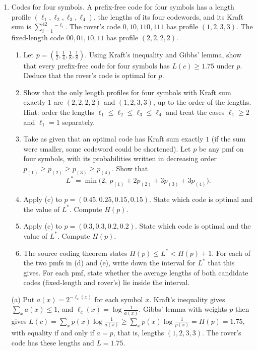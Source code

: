 \begin{enumerate}[resume*=quiz]
\item Codes for four symbols. A prefix-free code for four symbols has a length profile $(\ell_1,\ell_2,\ell_3,\ell_4)$, the lengths of its four codewords, and its Kraft sum is $\sum_{i=1}^42^{-\ell_i}$. The rover's code $0,10,110,111$ has profile $(1,2,3,3)$. The fixed-length code $00,01,10,11$ has profile $(2,2,2,2)$.
\begin{enumerate}[label=(\alph*),leftmargin=2em]
\item Let $p=(\tfrac12,\tfrac14,\tfrac18,\tfrac18)$. Using Kraft's inequality and Gibbs' lemma, show that every prefix-free code for four symbols has $L(c)\ge1.75$ under $p$. Deduce that the rover's code is optimal for $p$.
\item Show that the only length profiles for four symbols with Kraft sum exactly $1$ are $(2,2,2,2)$ and $(1,2,3,3)$, up to the order of the lengths. Hint: order the lengths $\ell_1\le\ell_2\le\ell_3\le\ell_4$ and treat the cases $\ell_1\ge2$ and $\ell_1=1$ separately.
\item Take as given that an optimal code has Kraft sum exactly $1$ (if the sum were smaller, some codeword could be shortened). Let $p$ be any pmf on four symbols, with its probabilities written in decreasing order $p_{(1)}\ge p_{(2)}\ge p_{(3)}\ge p_{(4)}$. Show that
\[
L^*=\min\big(2,\ p_{(1)}+2p_{(2)}+3p_{(3)}+3p_{(4)}\big).
\]
\item Apply (c) to $p=(0.45,0.25,0.15,0.15)$. State which code is optimal and the value of $L^*$. Compute $H(p)$.
\item Apply (c) to $p=(0.3,0.3,0.2,0.2)$. State which code is optimal and the value of $L^*$. Compute $H(p)$.
\item The source coding theorem states $H(p)\le L^*<H(p)+1$. For each of the two pmfs in (d) and (e), write down the interval for $L^*$ that this gives. For each pmf, state whether the average lengths of both candidate codes (fixed-length and rover's) lie inside the interval.
\end{enumerate}
\begin{solution}
(a) Put $a(x)=2^{-\ell_c(x)}$ for each symbol $x$. Kraft's inequality gives $\sum_xa(x)\le1$, and $\ell_c(x)=\log\frac1{a(x)}$. Gibbs' lemma with weights $p$ then gives
$L(c)=\sum_xp(x)\log\frac1{a(x)}\ge\sum_xp(x)\log\frac1{p(x)}=H(p)=1.75$,
with equality if and only if $a=p$, that is, lengths $(1,2,3,3)$. The rover's code has these lengths and $L=1.75$.


\end{solution}
\end{enumerate}
